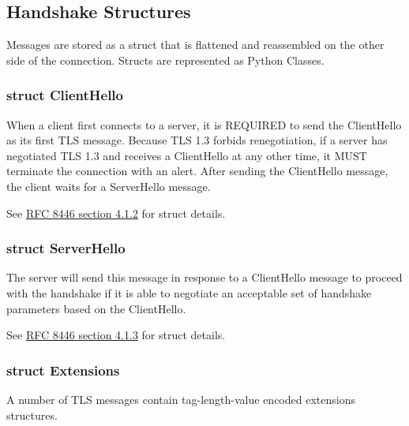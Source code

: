\documentclass{article}
\newcommand{\code}[1]{\tcbox[
    on line,
    colback=codebackground, boxsep=2pt,
    colframe=white, boxrule=0pt,
    top=0pt, bottom=0pt, left=0pt, right=0pt
]{\texttt{#1}}}
\begin{document}
\subsection{Handshake Structures}
Messages are stored as a struct that is flattened and reassembled on the other side of the connection. Structs are represented as Python Classes.
\subsubsection{struct ClientHello}
When a client first connects to a server, it is REQUIRED to send the ClientHello as its first TLS message.
Because TLS 1.3 forbids renegotiation, if a server has negotiated
TLS 1.3 and receives a ClientHello at any other time, it MUST
terminate the connection with an \code{unexpected\_message} alert.
After sending the ClientHello message, the client waits for a ServerHello message.

See \href{https://datatracker.ietf.org/doc/html/rfc8446#section-4.1.2}{RFC 8446 section 4.1.2\tiny\faExternalLink} for struct details.

\subsubsection{struct ServerHello}
The server will send this message in response to a ClientHello
message to proceed with the handshake if it is able to negotiate an
acceptable set of handshake parameters based on the ClientHello.

See \href{https://datatracker.ietf.org/doc/html/rfc8446#section-4.1.3}{RFC 8446 section 4.1.3\tiny\faExternalLink} for struct details.

\subsubsection{struct Extensions}
A number of TLS messages contain tag-length-value encoded extensions structures.
\end{document}
